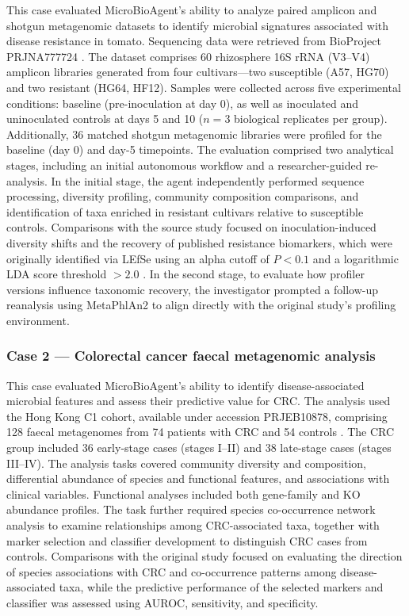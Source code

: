 \documentclass[10pt,letterpaper]{article}
\begin{document}
This case evaluated MicroBioAgent's ability to analyze paired amplicon and
shotgun metagenomic datasets to identify microbial signatures associated
with disease resistance in tomato. Sequencing data were retrieved from
BioProject PRJNA777724 \parencite{yin2022tomato}. The dataset comprises 60
rhizosphere 16S rRNA (V3--V4) amplicon libraries generated from four
cultivars---two susceptible (A57, HG70) and two resistant (HG64, HF12).
Samples were collected across five experimental conditions: baseline
(pre-inoculation at day 0), as well as inoculated and uninoculated controls
at days 5 and 10 ($n = 3$ biological replicates per group). Additionally,
36 matched shotgun metagenomic libraries were profiled for the baseline
(day 0) and day-5 timepoints. The evaluation comprised two analytical
stages, including an initial autonomous workflow and a researcher-guided re-analysis.
In the initial stage, the agent independently performed sequence processing,
diversity profiling, community composition comparisons, and identification
of taxa enriched in resistant cultivars relative to susceptible controls.
Comparisons with the source study focused on inoculation-induced diversity
shifts and the recovery of published resistance biomarkers, which were originally
identified via LEfSe using an alpha cutoff of $P < 0.1$ and a logarithmic LDA
score threshold $> 2.0$ \parencite{yin2022tomato}. In the second stage, to evaluate
how profiler versions influence taxonomic recovery, the investigator prompted
a follow-up reanalysis using MetaPhlAn2 to align directly with the original
study's profiling environment.

\subsubsection{Case 2 --- Colorectal cancer faecal metagenomic analysis}
\label{sec:methods-crc}

This case evaluated MicroBioAgent's ability to identify disease-associated
microbial features and assess their predictive value for CRC. The analysis
used the Hong Kong C1 cohort, available under accession
PRJEB10878, comprising 128 faecal metagenomes from 74 patients with CRC and
54 controls \parencite{yu2017crc}. The CRC group included 36 early-stage
cases (stages I--II) and 38 late-stage cases (stages III--IV). The analysis
tasks covered community diversity and composition, differential abundance
of species and functional features, and associations with clinical variables.
Functional analyses included both gene-family and KO abundance profiles. The
task further required species co-occurrence network
analysis to examine relationships among CRC-associated taxa, together with
marker selection and classifier development to distinguish CRC cases from
controls. Comparisons with the original study focused on evaluating the
direction of species associations with CRC and co-occurrence patterns among
disease-associated taxa, while the predictive performance of the selected
markers and classifier was assessed using AUROC, sensitivity, and specificity.
\end{document}
